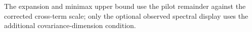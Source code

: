 The expansion and minimax upper bound use the pilot remainder against the corrected cross-term scale; only the optional observed spectral display uses the additional covariance-dimension condition.